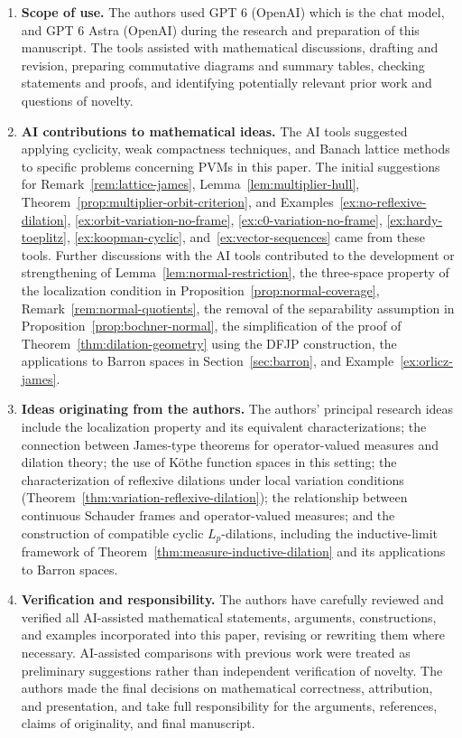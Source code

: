 \documentclass[11pt,leqno]{amsart}
\theoremstyle{compact}
\numberwithin{equation}{section}
\theoremstyle{compactremark}
\theoremstyle{compact}
\newcommand{\1}{\mathbbm{1}}
\begin{document}
\begin{enumerate}[itemsep=6pt]
\item \textbf{Scope of use.} The authors used GPT 6 (OpenAI) which is the chat model, and GPT 6 Astra (OpenAI) during the research and preparation of this manuscript. The tools assisted with mathematical discussions, drafting and revision, preparing commutative diagrams and summary tables, checking statements and proofs, and identifying potentially relevant prior work and questions of novelty.

\item \textbf{AI contributions to mathematical ideas.} The AI tools suggested applying cyclicity, weak compactness techniques, and Banach lattice methods to specific problems concerning PVMs in this paper. The initial suggestions for Remark~\ref{rem:lattice-james}, Lemma~\ref{lem:multiplier-hull}, Theorem~\ref{prop:multiplier-orbit-criterion}, and Examples~\ref{ex:no-reflexive-dilation}, \ref{ex:orbit-variation-no-frame}, \ref{ex:c0-variation-no-frame}, \ref{ex:hardy-toeplitz}, \ref{ex:koopman-cyclic}, and~\ref{ex:vector-sequences} came from these tools. Further discussions with the AI tools contributed to the development or strengthening of Lemma~\ref{lem:normal-restriction}, the three-space property of the localization condition in Proposition~\ref{prop:normal-coverage}, Remark~\ref{rem:normal-quotients}, the removal of the separability assumption in Proposition~\ref{prop:bochner-normal}, the simplification of the proof of Theorem~\ref{thm:dilation-geometry} using the DFJP construction, the applications to Barron spaces in Section~\ref{sec:barron}, and Example~\ref{ex:orlicz-james}.

\item \textbf{Ideas originating from the authors.} The authors' principal research ideas include the localization property and its equivalent characterizations; the connection between James-type theorems for operator-valued measures and dilation theory; the use of K\"othe function spaces in this setting; the characterization of reflexive dilations under local variation conditions (Theorem~\ref{thm:variation-reflexive-dilation}); the relationship between continuous Schauder frames and operator-valued measures; and the construction of compatible cyclic $L_p$-dilations, including the inductive-limit framework of Theorem~\ref{thm:measure-inductive-dilation} and its applications to Barron spaces.

\item \textbf{Verification and responsibility.} The authors have carefully reviewed and verified all AI-assisted mathematical statements, arguments, constructions, and examples incorporated into this paper, revising or rewriting them where necessary. AI-assisted comparisons with previous work were treated as preliminary suggestions rather than independent verification of novelty. The authors made the final decisions on mathematical correctness, attribution, and presentation, and take full responsibility for the arguments, references, claims of originality, and final manuscript.
\end{enumerate}
\end{document}
